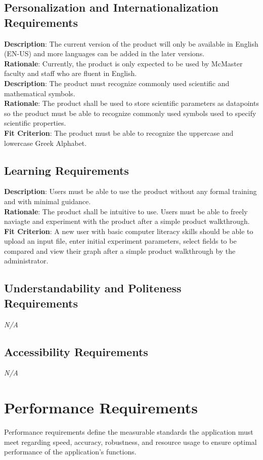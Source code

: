 \documentclass[12pt]{article}
\begin{document}
\subsection{Personalization and Internationalization Requirements}
\textbf{Description}: The current version of the product will only be available
in English (EN-US) and more languages can be added in the later versions.\\
\textbf{Rationale}: Currently, the product is only expected to be used by
McMaster faculty and staff who are fluent in English.\\
\newline
\textbf{Description}: The product must recognize commonly used scientific and
mathematical symbols.\\
\textbf{Rationale}: The product shall be used to store scientific parameters as
datapoints so the product must be able to recognize commonly used symbols used
to specify scientific properties.\\
\textbf{Fit Criterion}: The product must be able to recognize the uppercase and
lowercase Greek Alphabet.

\subsection{Learning Requirements}
\textbf{Description}: Users must be able to use the product without any formal
training and with minimal guidance.\\
\textbf{Rationale}: The product shall be intuitive to use. Users must be able to
freely naviagte and experiment with the product after a simple product
walkthrough.\\
\textbf{Fit Criterion}: A new user with basic computer literacy skills should be
able to upload an input file, enter initial experiment parameters, select fields
to be compared and view their graph after a simple product walkthrough by the
administrator.

\subsection{Understandability and Politeness Requirements}
\emph{N/A}

\subsection{Accessibility Requirements}
\emph{N/A}

\section{Performance Requirements}
Performance requirements define the measurable standards the application must meet regarding speed, accuracy, robustness, and resource usage to ensure optimal performance of the application's functions.
\end{document}
